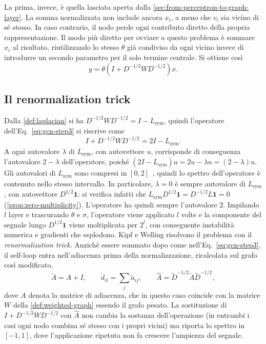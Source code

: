 La prima, invece, è quella lasciata aperta dalla \cref{sec:from-perceptron-to-graph-layer}. La somma normalizzata non include ancora $x_i$, a meno che $v_i$ sia vicino di sé stesso. In caso contrario, il nodo perde ogni contributo diretto della propria rappresentazione. Il modo più diretto per ovviare a questo problema è sommare $x_i$ al risultato, riutilizzando lo stesso $\theta$ già condiviso da ogni vicino invece di introdurre un secondo parametro per il solo termine centrale. Si ottiene così
\begin{equation}
\label{eq:gcn-step3}
y = \theta\left(I + D^{-1/2}WD^{-1/2}\right)x.
\end{equation}

\subsection{Il renormalization trick}

Dalla \cref{def:laplacian} si ha $D^{-1/2}WD^{-1/2} = I - L_{\mathrm{sym}}$, quindi l'operatore dell'Eq.~\eqref{eq:gcn-step3} si riscrive come
$$I + D^{-1/2}WD^{-1/2} = 2I - L_{\mathrm{sym}}.$$
A ogni autovalore $\lambda$ di $L_{\mathrm{sym}}$, con autovettore $u$, corrisponde di conseguenza l'autovalore $2-\lambda$ dell'operatore, poiché $(2I - L_{\mathrm{sym}})u = 2u - \lambda u = (2-\lambda)u$. Gli autovalori di $L_{\mathrm{sym}}$ sono compresi in $[0,2]$~\cite{chung1997spectral}, quindi lo spettro dell'operatore è contenuto nello stesso intervallo. In particolare, $\lambda=0$ è sempre autovalore di $L_{\mathrm{sym}}$, con autovettore $D^{1/2}\mathbf 1$: si verifica infatti che $L_{\mathrm{sym}}D^{1/2}\mathbf 1 = D^{-1/2}L\mathbf 1 = 0$ (\cref{prop:zero-multiplicity}). L'operatore ha quindi sempre l'autovalore $2$. Impilando $l$ layer e trascurando $\theta$ e $\sigma$, l'operatore viene applicato $l$ volte e la componente del segnale lungo $D^{1/2}\mathbf 1$ viene moltiplicata per $2^l$, con conseguente instabilità numerica e gradienti che esplodono. Kipf e Welling risolvono il problema con il \emph{renormalization trick}. Anziché essere sommato dopo come nell'Eq.~\eqref{eq:gcn-step3}, il self-loop entra nell'adiacenza prima della normalizzazione, ricalcolata sul grafo così modificato,
\begin{equation}
\label{eq:renormalization}
\tilde A = A + I,\qquad \tilde d_{ii}=\sum_j\tilde a_{ij},\qquad \hat A = \tilde D^{-1/2}\tilde A\tilde D^{-1/2},
\end{equation}
dove $A$ denota la matrice di adiacenza, che in questo caso coincide con la matrice $W$ della \cref{def:weighted-graph} essendo il grafo pesato. La sostituzione di $I + D^{-1/2}WD^{-1/2}$ con $\hat A$ non cambia la sostanza dell'operazione (in entrambi i casi ogni nodo combina sé stesso con i propri vicini) ma riporta lo spettro in $[-1,1]$, dove l'applicazione ripetuta non fa crescere l'ampiezza del segnale.

